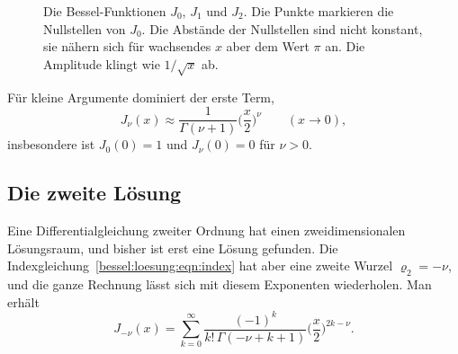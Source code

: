 \begin{figure}
\centering
{}
\caption{Die Bessel-Funktionen $J_0$, $J_1$ und $J_2$.
Die Punkte markieren die Nullstellen von $J_0$.
Die Abstände der Nullstellen sind nicht konstant, sie nähern sich für wachsendes $x$ aber dem Wert $\pi$ an.
Die Amplitude klingt wie $1/\sqrt{x}$ ab.
\label{bessel:loesung:fig:jnu}}
\end{figure}
Für kleine Argumente dominiert der erste Term,
\begin{equation}
J_\nu(x)
\approx
\frac{1}{\Gamma(\nu+1)}
\biggl(\frac{x}{2}\biggr)^{\nu}
\qquad (x\to 0),
\label{bessel:loesung:eqn:kleinx}
\end{equation}
insbesondere ist $J_0(0)=1$ und $J_\nu(0)=0$ für $\nu>0$.

%
%
\subsection{Die zweite Lösung
\label{bessel:loesung:subsection:ynu}}
Eine Differentialgleichung zweiter Ordnung hat einen zweidimensionalen Lösungsraum, und bisher ist erst eine Lösung gefunden.
Die Indexgleichung~\eqref{bessel:loesung:eqn:index} hat aber eine zweite Wurzel $\varrho_2=-\nu$, und die ganze Rechnung lässt sich mit diesem Exponenten wiederholen.
Man erhält
\begin{equation}
J_{-\nu}(x)
=
\sum_{k=0}^\infty
\frac{(-1)^k}{k!\,\Gamma(-\nu+k+1)}
\biggl(\frac{x}{2}\biggr)^{2k-\nu}.
\label{bessel:loesung:eqn:jminusnu}
\end{equation}

